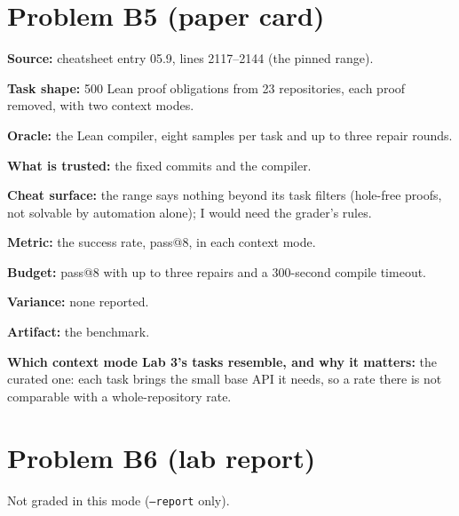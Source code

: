 \documentclass[11pt]{article}
\begin{document}
\section*{Problem B5 (paper card)}\label{ans:B5}
\begin{answer}
\textbf{Source:} cheatsheet entry 05.9, lines 2117--2144 (the pinned range).

\textbf{Task shape:} 500 Lean proof obligations from 23 repositories, each
proof removed, with two context modes.

\textbf{Oracle:} the Lean compiler, eight samples per task and up to three
repair rounds.

\textbf{What is trusted:} the fixed commits and the compiler.

\textbf{Cheat surface:} the range says nothing beyond its task filters
(hole-free proofs, not solvable by automation alone); I would need the
grader's rules.

\textbf{Metric:} the success rate, pass@8, in each context mode.

\textbf{Budget:} pass@8 with up to three repairs and a 300-second compile
timeout.

\textbf{Variance:} none reported.

\textbf{Artifact:} the benchmark.

\textbf{Which context mode Lab 3's tasks resemble, and why it matters:} the
curated one: each task brings the small base API it needs, so a rate there
is not comparable with a whole-repository rate.
\end{answer}

\section*{Problem B6 (lab report)}\label{ans:B6}
\begin{answer}
Not graded in this mode (\texttt{--report} only).
\end{answer}
\end{document}
